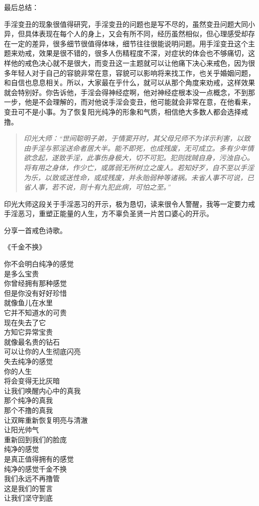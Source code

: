 最后总结：

手淫变丑的现象很值得研究，手淫变丑的问题也是写不尽的，虽然变丑问题大同小异，但具体表现在每个人的身上，又会有所不同，经历虽然相似，但心理感受却存在一定的差异，很多细节很值得体味，细节往往很能说明问题。用手淫变丑这个主题来劝戒，效果是很不错的，很多人伤精程度不深，对症状的体会也不够痛切，这样他的戒色决心就不是很大，而变丑这一主题就可以让他痛下决心来戒色，因为很多年轻人对于自己的容貌非常在意，容貌可以影响将来找工作，也关乎婚姻问题，和自信也息息相关。所以，大家最在乎什么，就可以从那个角度来劝戒，这样效果就会特别好。你告诉他，手淫会得神经症啊，他对神经症根本没一点概念，不到那一步，他是不会理解的，而对他说手淫会变丑，他可能就会非常在意，在他看来，变丑可不是小事。为了恢复阳光纯净的形象和气质，相信绝大多数人都会选择戒撸。

\begin{quote}\it
    印光大师：“世间聪明子弟，于情窦开时，其父母兄师不为详示利害，以致由手淫与邪淫送命者居大半。能不即死，也成残废，无可成立。多有少年情欲念起，遂致手淫，此事伤身极大，切不可犯。犯则戕贼自身，污浊自心。将有用之身体，作少亡，或孱弱无所树立之废人。若知好歹，自不至以手淫为乐，以致或送性命，或成残废，并永贻弱种等诸祸。未省人事不可说，已省人事，若不说，则十有九犯此病，可怕之至。”
\end{quote}

印光大师这段关于手淫恶习的开示，极为恳切，读来很令人警醒，我等一定要力戒手淫恶习，重塑正能量的人生，方不辜负圣贤一片苦口婆心的开示。

分享一首戒色诗歌。

\begin{center}
    《千金不换》\it
    \begin{multicols}{2}
        你不会明白纯净的感觉 \\ 是多么宝贵 \\ 你曾经拥有那种感觉 \\ 但是你没有好好珍惜 \\ 就像鱼儿在水里 \\ 它并不知道水的可贵 \\ 现在失去了它 \\ 方知它异常宝贵 \\ 就像最名贵的钻石 \\ 可以让你的人生彻底闪亮 \\ 失去纯净的感觉 \\ 你的人生 \\ 将会变得无比灰暗 \\ 让我们唤醒内心中的真我 \\ 那个纯净的真我 \\ 那个不撸的真我 \\ 让双眸重新恢复明亮与清澈 \\ 让阳光帅气 \\ 重新回到我们的脸庞 \\ 纯净的感觉 \\ 是真正值得拥有的感觉 \\ 纯净的感觉千金不换 \\ 我们永远不再撸管 \\ 这是我们的誓言 \\ 让我们坚守到底
    \end{multicols}
\end{center}
